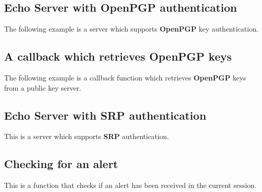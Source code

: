 \subsection{Echo Server with OpenPGP authentication}
The following example is a server which supports {\bf OpenPGP} key authentication.


\subsection{A callback which retrieves OpenPGP keys}
The following example is a callback function which retrieves {\bf OpenPGP} keys from
a public key server.


\subsection{Echo Server with SRP authentication}
This is a server which supports {\bf SRP} authentication.


\subsection{Checking for an alert}
This is a function that checks if an alert has been received
in the current session.



